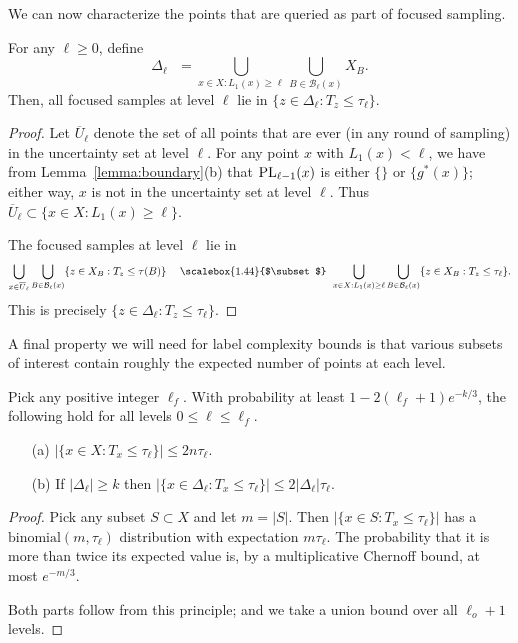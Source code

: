 \documentclass[anon,12pt]{colt2022} %
\def\B{{\mathcal B}}
\def\PL{{\mbox{\rm PL}}}
\newcommand\bigsubset[1][1.19]{%
   \mathrel{\vcenter{\hbox{\scalebox{#1}{$\subset$}}}}}
\begin{document}
We can now characterize the points that are queried as part of focused sampling.
\begin{lemma}
For any $\ell \geq 0$, define
\begin{equation}
\Delta_{\ell} \ \ \ = \bigcup_{x \in X: L_1(x) \geq \ell} \bigcup_{B \in \B_{\ell}(x)} X_B .
\label{eq:sampling-region}
\end{equation}
Then, all focused samples at level $\ell$ lie in $\{z \in \Delta_\ell: T_z \leq \tau_\ell \}$.
\label{lemma:focused}
\end{lemma}
\begin{proof}
Let $\overline{U}_\ell$ denote the set of all points that are ever (in any round of sampling) in the uncertainty set at level $\ell$. For any point $x$ with $L_1(x) < \ell$, we have from Lemma~\ref{lemma:boundary}(b) that $\PL_{\ell-1}(x)$ is either $\{\}$ or $\{g^*(x)\}$; either way, $x$ is not in the uncertainty set at level $\ell$. Thus $\overline{U}_\ell \subset \{x \in X: L_1(x) \geq \ell\}$.

The focused samples at level $\ell$ lie in
$$
\bigcup_{x \in \overline{U}_\ell} \bigcup_{B \in \B_\ell(x)} \{z \in X_B: T_z \leq \tau(B) \}
\ \ \ 
\bigsubset[1.44]
\ 
\bigcup_{x \in X: L_1(x) \geq \ell} \bigcup_{B \in \B_\ell(x)} \{z \in X_B: T_z \leq \tau_\ell \} .
$$
This is precisely $\{z \in \Delta_\ell: T_z \leq \tau_\ell \}$.
\end{proof}

A final property we will need for label complexity bounds is that various subsets of interest contain roughly the expected number of points at each level.
\begin{lemma}
Pick any positive integer $\ell_f$. With probability at least $1-2(\ell_f+1)e^{-k/3}$, the following hold for all levels $0 \leq \ell \leq \ell_f$.
\begin{enumerate}
\item[(a)] $|\{x \in X: T_x \leq \tau_\ell\}| \leq 2 n \tau_\ell$.
\item[(b)] If $|\Delta_\ell| \geq k$ then $|\{x \in \Delta_{\ell}: T_x \leq \tau_\ell\}| \leq 2 |\Delta_\ell| \tau_\ell$.
\end{enumerate}
\label{lemma:level-distribution}
\end{lemma}
\begin{proof} 
Pick any subset $S \subset X$ and let $m = |S|$. Then $|\{x \in S: T_x \leq \tau_\ell\}|$ has a $\mbox{binomial}(m, \tau_\ell)$ distribution with expectation $m \tau_\ell$. The probability that it is more than twice its expected value is, by a multiplicative Chernoff bound, at most $e^{-m/3}$.

Both parts follow from this principle; and we take a union bound over all $\ell_o + 1$ levels.
\end{proof}
\end{document}
